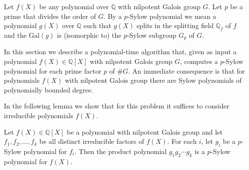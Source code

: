 \documentclass[prodmod,acmtalg]{acmsmall}
\newcommand{\Gal}[1]{{\ensuremath{\mathrm{Gal}\left(#1\right)}}}
\newcommand{\Q}{\ensuremath{\mathbb{Q}}}
\begin{document}
\begin{definition}
  Let $f(X)$ be any polynomial over $\Q$ with nilpotent Galois group
  $G$. Let $p$ be a prime that divides the order of $G$. By a
  $p$-Sylow polynomial we mean a polynomial $g(X)$ over $\Q$ such that
  $g(X)$ splits in the splitting field $\Q_f$ of $f$ and the $\Gal{g}$
  is (isomorphic to) the $p$-Sylow subgroup $G_p$ of $G$.
\end{definition}

In this section we describe a polynomial-time algorithm that, given as
input a polynomial $f(X)\in\Q[X]$ with nilpotent Galois group $G$,
computes a $p$-Sylow polynomial for each prime factor $p$ of $\# G$.
An immediate consequence is that for polynomials $f(X)$ with nilpotent
Galois group there are Sylow polynomials of polynomially bounded
degree.

In the following lemma we show that for this problem it suffices to
consider irreducible polynomials $f(X)$.

\begin{lemma}\label{lem-sylow-product}
  Let $f(X)\in\Q[X]$ be a polynomial with nilpotent Galois group and
  let $f_1,f_2,\ldots,f_k$ be all distinct irreducible factors of
  $f(X)$. For each $i$, let $g_i$ be a $p$-Sylow polynomial for $f_i$.
  Then the product polynomial $g_1g_2\cdots g_k$ is a $p$-Sylow
  polynomial for $f(X)$.
\end{lemma}
\end{document}
